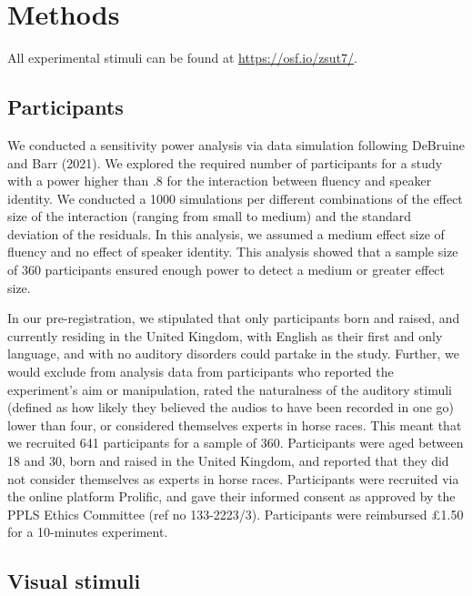 \documentclass[
  man,floatsintext]{apa7}
\begin{document}
\hypertarget{methods}{%
\section{Methods}\label{methods}}

All experimental stimuli can be found at \url{https://osf.io/zsut7/}.

\hypertarget{participants}{%
\subsection{Participants}\label{participants}}

We conducted a sensitivity power analysis via data simulation following DeBruine and Barr (2021). We explored the required number of participants for a study with a power higher than .8 for the interaction between fluency and speaker identity. We conducted a 1000 simulations per different combinations of the effect size of the interaction (ranging from small to medium) and the standard deviation of the residuals. In this analysis, we assumed a medium effect size of fluency and no effect of speaker identity. This analysis showed that a sample size of 360 participants ensured enough power to detect a medium or greater effect size.

In our pre-registration, we stipulated that only participants born and raised, and currently residing in the United Kingdom, with English as their first and only language, and with no auditory disorders could partake in the study. Further, we would exclude from analysis data from participants who reported the experiment's aim or manipulation, rated the naturalness of the auditory stimuli (defined as how likely they believed the audios to have been recorded in one go) lower than four, or considered themselves experts in horse races. This meant that we recruited 641 participants for a sample of 360. Participants were aged between 18 and 30, born and raised in the United Kingdom, and reported that they did not consider themselves as experts in horse races. Participants were recruited via the online platform Prolific, and gave their informed consent as approved by the PPLS Ethics Committee (ref no 133-2223/3). Participants were reimbursed £1.50 for a 10-minutes experiment.

\hypertarget{visual-stimuli}{%
\subsection{Visual stimuli}\label{visual-stimuli}}
\end{document}

